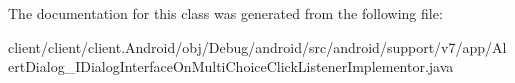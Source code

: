 The documentation for this class was generated from the following file\+:\begin{DoxyCompactItemize}
\item 
client/client/client.\+Android/obj/\+Debug/android/src/android/support/v7/app/Alert\+Dialog\+\_\+\+I\+Dialog\+Interface\+On\+Multi\+Choice\+Click\+Listener\+Implementor.\+java\end{DoxyCompactItemize}
